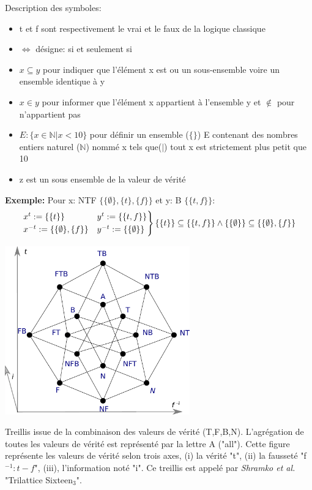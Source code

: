 \begin{refsegment}
    Description des symboles:\nolisttopbreak
    \begin{itemize}
        \item t et f sont respectivement le vrai et le faux de la logique classique
        \item $\iff$ désigne: si et seulement si
        \item $x \subseteq y$ pour indiquer que  l'élément x est ou un sous-ensemble voire un ensemble identique à y
        \item $x \in y$ pour informer que l'élément x appartient à l'ensemble y et  $\notin$ pour n'appartient pas
        \item $E : \{ x \in \mathbb{N} | x < 10 \}$ pour définir un ensemble ($\{\}$) E contenant des nombres entiers naturel ($\mathbb{N}$) nommé x tels que($|$) tout x est strictement plus petit que 10
        \item z est un sous ensemble de la valeur de vérité
    \end{itemize}

    \textbf{Exemple:} Pour x: NTF $\{\{\emptyset\},\{t\},\{f\}\}$ et y: B $\{\{t,f\}\}$:\nolisttopbreak \vspace{-0.5cm}
    \begin{equation*}
    \begin{rcases}
    x^{t}  := \{ \{t\} \}               &y^{t}  := \{ \{t,f\} \}\\
    x^{-t} := \{\{\emptyset\},\{f\} \}  &y^{-t} := \{ \{\emptyset\} \} \\
    \end{rcases}
     \{ \{t\} \} \subseteq \{ \{t,f\} \} \land \{ \{\emptyset\} \} \subseteq \{\{\emptyset\},\{f\} \}
    \end{equation*}


    \begin{shadedfigure}[H]
        \centering
        \includegraphics[width=0.6\textwidth]{img/Generalized_Truth_Values_and_Multilattices.pdf}
        \caption{ Treillis issue de la combinaison des valeurs de vérité (T,F,B,N). L'agrégation de toutes les valeurs de vérité est représenté par la lettre A ("all"). Cette figure représente les valeurs de vérité selon trois axes, (i) la vérité "t", (ii) la fausseté "f$^{-1}: t -f $", (iii), l'information noté "i". Ce treillis est appelé par \textit{Shramko et al.} "Trilattice Sixteen$_{3}$".  }
        \label{fig:sixteen_truth_values}
    \end{shadedfigure}


\end{refsegment}
